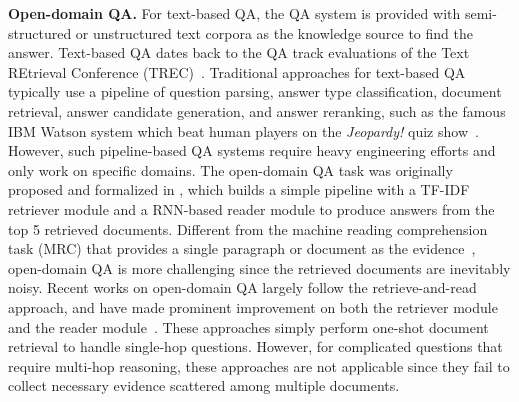 \documentclass[sigconf]{acmart}
\begin{document}
\noindent \textbf{Open-domain QA.}  For text-based QA, the QA system is provided with semi-structured or unstructured text corpora as the knowledge source to find the answer. Text-based QA dates back to the QA track evaluations of the Text REtrieval Conference (TREC)~\cite{voorhees2000building}. Traditional approaches for text-based QA typically use a pipeline of question parsing, answer type classification, document retrieval, answer candidate generation, and answer reranking, such as the famous IBM Watson system which beat human players on the \textit{Jeopardy!} quiz show~\cite{ferrucci2010building}. However, such pipeline-based QA systems require heavy engineering efforts and only work on specific domains.
The open-domain QA task was originally proposed and formalized in \citet{chen-etal-2017-reading}, which builds a simple pipeline with a TF-IDF retriever module and a RNN-based reader module to produce answers from the top 5 retrieved documents. Different from the machine reading comprehension task (MRC) that provides a single paragraph or document as the evidence~\cite{rajpurkar-etal-2016-squad}, open-domain QA is more challenging since the retrieved documents are inevitably noisy. Recent works on open-domain QA largely follow the retrieve-and-read approach, and have made prominent improvement on both the retriever module~\cite{lee-etal-2019-latent,wang2018r,nie-etal-2019-revealing} and the reader module~\cite{wang2018evidence,wang2019sigir,ni-etal-2019-learning}. These approaches simply perform one-shot document retrieval to handle single-hop questions. However, for complicated questions that require multi-hop reasoning, these approaches are not applicable since they fail to collect necessary evidence scattered among multiple documents.
\end{document}
